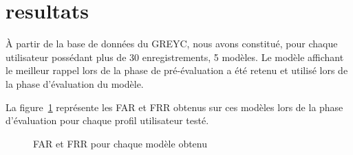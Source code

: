 \section{resultats}

À partir de la base de données du GREYC, nous avons constitué, pour chaque utilisateur possédant plus de 30 enregistrements, 5 modèles. Le modèle affichant le meilleur rappel lors de la phase de pré-évaluation a été retenu et utilisé lors de la phase d'évaluation du modèle.

La figure~\ref{results} représente les FAR et FRR obtenus sur ces modèles lors de la phase d'évaluation pour chaque profil utilisateur testé.


\loadedtable

\begin{figure}
\caption{FAR et FRR pour chaque modèle obtenu}
\label{results}
\end{figure}